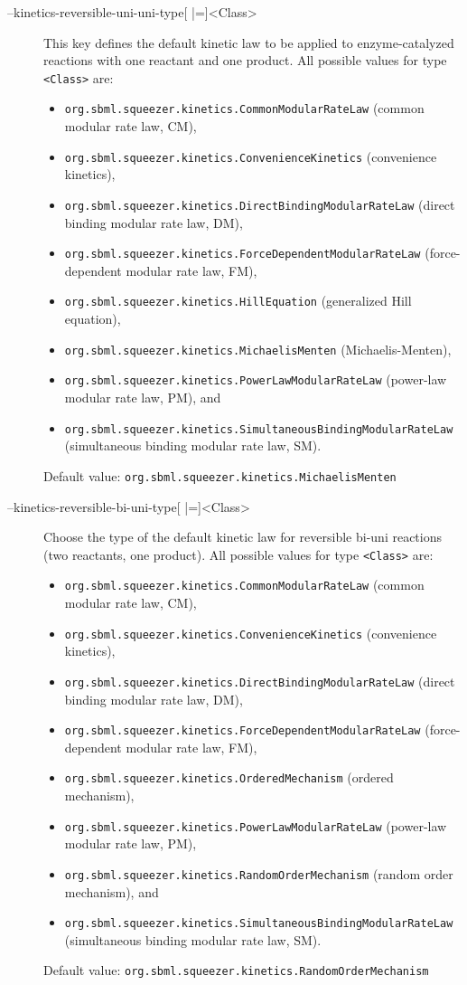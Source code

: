 \begin{description}
\item[--kinetics-reversible-uni-uni-type{[} |={]}<Class>]
  This key defines the default kinetic law to be applied to enzyme-catalyzed
  reactions with one reactant and one product.
  All possible values for type \texttt{<Class>} are:
  \begin{itemize}
  \item\texttt{org.sbml.squeezer.kinetics.CommonModularRateLaw} (common modular rate law, CM),
  \item\texttt{org.sbml.squeezer.kinetics.ConvenienceKinetics} (convenience kinetics),
  \item\texttt{org.sbml.squeezer.kinetics.DirectBindingModularRateLaw} (direct binding modular rate law, DM),
  \item\texttt{org.sbml.squeezer.kinetics.ForceDependentModularRateLaw} (force-dependent modular rate law, FM),
  \item\texttt{org.sbml.squeezer.kinetics.HillEquation} (generalized Hill equation),
  \item\texttt{org.sbml.squeezer.kinetics.MichaelisMenten} (Michaelis-Menten),
  \item\texttt{org.sbml.squeezer.kinetics.PowerLawModularRateLaw} (power-law modular rate law, PM), and
  \item\texttt{org.sbml.squeezer.kinetics.SimultaneousBindingModularRateLaw} (simultaneous binding modular rate law, SM).
  \end{itemize}
  Default value: \texttt{org.sbml.squeezer.kinetics.MichaelisMenten}

\item[--kinetics-reversible-bi-uni-type{[} |={]}<Class>]
  Choose the type of the default kinetic law for reversible bi-uni
  reactions (two reactants, one product).
  All possible values for type \texttt{<Class>} are:
  \begin{itemize}
  \item\texttt{org.sbml.squeezer.kinetics.CommonModularRateLaw} (common modular rate law, CM),
  \item\texttt{org.sbml.squeezer.kinetics.ConvenienceKinetics} (convenience kinetics),
  \item\texttt{org.sbml.squeezer.kinetics.DirectBindingModularRateLaw} (direct binding modular rate law, DM),
  \item\texttt{org.sbml.squeezer.kinetics.ForceDependentModularRateLaw} (force-dependent modular rate law, FM),
  \item\texttt{org.sbml.squeezer.kinetics.OrderedMechanism} (ordered mechanism),
  \item\texttt{org.sbml.squeezer.kinetics.PowerLawModularRateLaw} (power-law modular rate law, PM),
  \item\texttt{org.sbml.squeezer.kinetics.RandomOrderMechanism} (random order mechanism), and
  \item\texttt{org.sbml.squeezer.kinetics.SimultaneousBindingModularRateLaw} (simultaneous binding modular rate law, SM).
  \end{itemize}
  Default value: \texttt{org.sbml.squeezer.kinetics.RandomOrderMechanism}


\end{description}
